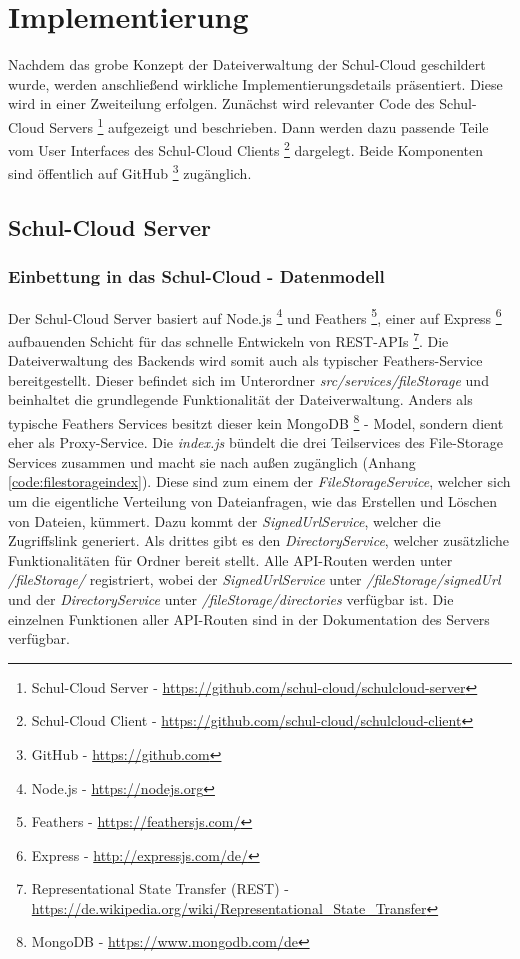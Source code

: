 \section{Implementierung}
\label{sec:implementation}

Nachdem das grobe Konzept der Dateiverwaltung der Schul-Cloud geschildert wurde, werden anschließend wirkliche Implementierungsdetails präsentiert. Diese wird in einer Zweiteilung erfolgen. Zunächst wird relevanter Code des Schul-Cloud Servers \footnote{Schul-Cloud Server - \url{https://github.com/schul-cloud/schulcloud-server}} aufgezeigt und beschrieben. Dann werden dazu passende Teile vom User Interfaces des Schul-Cloud Clients \footnote{Schul-Cloud Client - \url{https://github.com/schul-cloud/schulcloud-client}} dargelegt. Beide Komponenten sind öffentlich auf GitHub \footnote{GitHub - \url{https://github.com}} zugänglich.

\subsection{Schul-Cloud Server}
\subsubsection{Einbettung in das Schul-Cloud - Datenmodell}

Der Schul-Cloud Server basiert auf Node.js \footnote{Node.js - \url{https://nodejs.org}} und Feathers \footnote{Feathers - \url{https://feathersjs.com/}}, einer auf Express \footnote{Express - \url{http://expressjs.com/de/}} aufbauenden Schicht für das schnelle Entwickeln von REST-APIs \footnote{Representational State Transfer (REST) - \url{https://de.wikipedia.org/wiki/Representational_State_Transfer}}. Die Dateiverwaltung des Backends wird somit auch als typischer Feathers-Service bereitgestellt. Dieser befindet sich im Unterordner \textit{src/services/fileStorage} und beinhaltet die grundlegende Funktionalität der Dateiverwaltung. Anders als typische Feathers Services besitzt dieser kein MongoDB \footnote{MongoDB - \url{https://www.mongodb.com/de}} - Model, sondern dient eher als Proxy-Service. Die \textit{index.js} bündelt die drei Teilservices des File-Storage Services zusammen und macht sie nach außen zugänglich (Anhang \ref{code:filestorageindex}). Diese sind zum einem der \textit{FileStorageService}, welcher sich um die eigentliche Verteilung von Dateianfragen, wie das Erstellen und Löschen von Dateien, kümmert. Dazu kommt der \textit{SignedUrlService}, welcher die Zugriffslink generiert. Als drittes gibt es den \textit{DirectoryService}, welcher zusätzliche Funktionalitäten für Ordner bereit stellt. Alle API-Routen werden unter \textit{/fileStorage/} registriert, wobei der \textit{SignedUrlService} unter \textit{/fileStorage/signedUrl} und der \textit{DirectoryService} unter \textit{/fileStorage/directories} verfügbar ist. Die einzelnen Funktionen aller API-Routen sind in der Dokumentation des Servers \cite{online:serverswagger} verfügbar. \\


